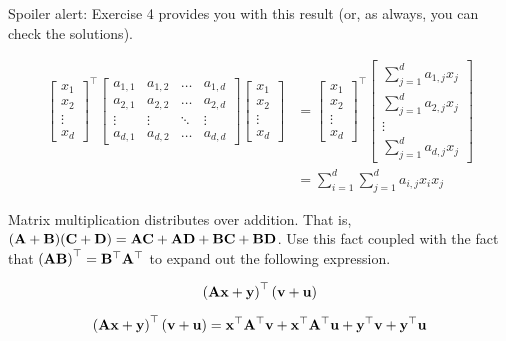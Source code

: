 \documentclass[assignment02_Solutions]{subfiles}
\begin{document}
\begin{exercise}[(15 minutes)]
Spoiler alert: Exercise 4 provides you with this result (or, as always, you can check the solutions).

\begin{boxedsolution}
\begin{align}
\begin{bmatrix} x_1 \\ x_2 \\ \vdots \\ x_d \end{bmatrix}^\top \begin{bmatrix} a_{1,1} & a_{1,2} & \ldots & a_{1,d} \\ a_{2,1} & a_{2,2} & \ldots & a_{2,d} \\ \vdots & \vdots & \ddots & \vdots \\ a_{d,1} & a_{d,2} & \ldots & a_{d,d} \end{bmatrix}\begin{bmatrix} x_1 \\ x_2 \\ \vdots \\ x_d \end{bmatrix} &= \begin{bmatrix} x_1 \\ x_2 \\ \vdots \\ x_d \end{bmatrix}^\top \begin{bmatrix} \sum_{j=1}^d a_{1,j} x_j \\ \sum_{j=1}^d a_{2,j} x_j  \\ \vdots \\ \sum_{j=1}^d a_{d,j} x_j \end{bmatrix}\\
&= \sum_{i=1}^d \sum_{j=1}^d a_{i,j}  x_i x_j
\end{align}
\end{boxedsolution}

\ees

\end{exercise}

\begin{exercise}[(5 minutes)]
Matrix multiplication distributes over addition.  That is, $(\mathbf{A} + \mathbf{B}) (\mathbf{C} + \mathbf{D}) = \mathbf{A}\mathbf{C} + \mathbf{A}\mathbf{D} + \mathbf{B} \mathbf{C} + \mathbf{B} \mathbf{D}$.  Use this fact coupled with the fact that $\left(\mathbf{A} \mathbf{B} \right)^\top = \mathbf{B}^\top \mathbf{A}^\top$ to expand out the following expression.

$$\left ( \mathbf{A} \mathbf{x}  + \mathbf{y} \right )^\top \left (\mathbf{v} + \mathbf{u} \right)$$

\begin{boxedsolution}
$$\left ( \mathbf{A} \mathbf{x}  + \mathbf{y} \right )^\top \left (\mathbf{v} + \mathbf{u} \right) = \mathbf{x}^\top \mathbf{A}^\top \mathbf{v} + \mathbf{x}^\top \mathbf{A}^\top \mathbf{u} + \mathbf{y}^\top \mathbf{v} + \mathbf{y}^\top \mathbf{u}$$
\end{boxedsolution}

\end{exercise}
\end{document}
